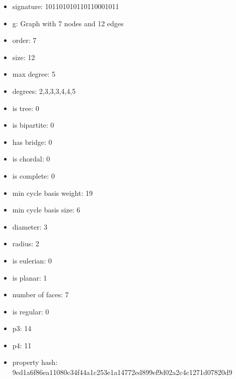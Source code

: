 \begin{itemize}
\item signature: 101101010110110001011
\item g: Graph with 7 nodes and 12 edges
\item order: 7
\item size: 12
\item max degree: 5
\item degrees: 2,3,3,3,4,4,5
\item is tree: 0
\item is bipartite: 0
\item has bridge: 0
\item is chordal: 0
\item is complete: 0
\item min cycle basis weight: 19
\item min cycle basis size: 6
\item diameter: 3
\item radius: 2
\item is eulerian: 0
\item is planar: 1
\item number of faces: 7
\item is regular: 0
\item p3: 14
\item p4: 11
\item property hash: 9ed1a6f86ea11080c34f44a1c253e1a14772ed899ef9d02a2c4c1271d07820d9
\end{itemize}
\newpage
\begin{figure}
\end{figure}
